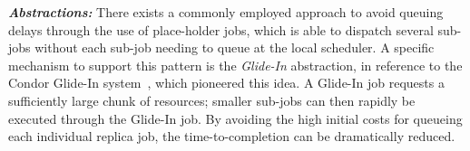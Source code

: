 \documentclass{rspublic}
\newcommand{\alnote}[1]{ {\textcolor{blue} { ***AL: #1 }}}
\newcommand{\jhanote}[1]{ {\textcolor{red} { ***SJ: #1 }}}
\newcommand{\alnote}[1]{}
\newcommand{\jhanote}[1]{}
\newcommand{\I}[1]{\textit{#1}}
\newcommand{\replicaagent}[1]{Replica-Agent }
\newcommand{\remanager}[1]{RE-Manager }
\begin{document}
{\noindent \it \bf Abstractions:} There exists a commonly employed approach to
avoid queuing delays through the use of place-holder jobs, which is
able to dispatch several sub-jobs without each sub-job needing to
queue at the local scheduler. A specific mechanism to support this
pattern is the \emph{Glide-In} abstraction, in reference to the Condor
Glide-In system~\citep{citeulike:291860}, which pioneered this idea. A
Glide-In job requests a sufficiently large chunk of resources; smaller
sub-jobs can then rapidly be executed through the Glide-In job.  By
avoiding the high initial costs for queueing each individual replica
job, the time-to-completion can be dramatically reduced.


% 
                      
\end{document}
